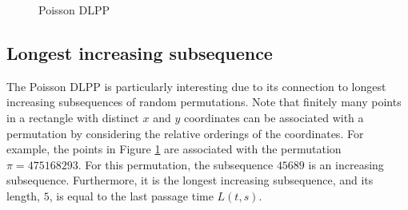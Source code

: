 \documentclass[10pt]{article}
\theoremstyle{plain}
\theoremstyle{definition}
\newcommand{\TW}{\mathrm{TW}}  %
\newcommand{\FTW}{\mathrm{F}_{\TW}}  %
\numberwithin{equation}{section}
\begin{document}

\begin{figure}
\centering {}
\caption{Poisson DLPP}
\label{fig:PoissonDLPP}
\end{figure}


\subsection{Longest increasing subsequence}

The Poisson DLPP is particularly interesting due to its connection to longest increasing subsequences of random permutations. 
Note that finitely many points in a rectangle with distinct $x$ and $y$ coordinates can be associated with a permutation by considering the relative orderings of the coordinates. 
For example, the points in Figure \ref{fig:PoissonDLPP} are associated with the permutation $\pi=475168293$. 
For this permutation, the subsequence $45689$ is an increasing subsequence.  
Furthermore, it is the longest increasing subsequence, and its length, $5$, is equal to the last passage time $L(t,s)$. 
\end{document}
